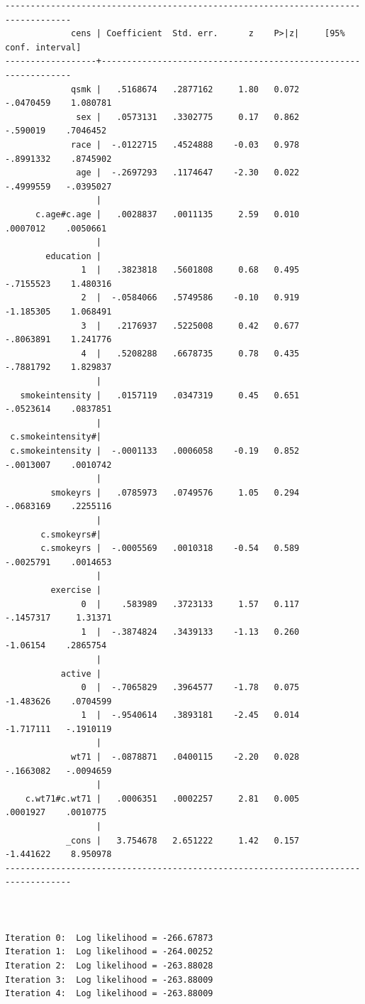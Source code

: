 \documentclass[
  10pt,
  a4paper,
]{book}
\begin{document}
\begin{verbatim}
-----------------------------------------------------------------------------------
             cens | Coefficient  Std. err.      z    P>|z|     [95% conf. interval]
------------------+----------------------------------------------------------------
             qsmk |   .5168674   .2877162     1.80   0.072    -.0470459    1.080781
              sex |   .0573131   .3302775     0.17   0.862     -.590019    .7046452
             race |  -.0122715   .4524888    -0.03   0.978    -.8991332    .8745902
              age |  -.2697293   .1174647    -2.30   0.022    -.4999559   -.0395027
                  |
      c.age#c.age |   .0028837   .0011135     2.59   0.010     .0007012    .0050661
                  |
        education |
               1  |   .3823818   .5601808     0.68   0.495    -.7155523    1.480316
               2  |  -.0584066   .5749586    -0.10   0.919    -1.185305    1.068491
               3  |   .2176937   .5225008     0.42   0.677    -.8063891    1.241776
               4  |   .5208288   .6678735     0.78   0.435    -.7881792    1.829837
                  |
   smokeintensity |   .0157119   .0347319     0.45   0.651    -.0523614    .0837851
                  |
 c.smokeintensity#|
 c.smokeintensity |  -.0001133   .0006058    -0.19   0.852    -.0013007    .0010742
                  |
         smokeyrs |   .0785973   .0749576     1.05   0.294    -.0683169    .2255116
                  |
       c.smokeyrs#|
       c.smokeyrs |  -.0005569   .0010318    -0.54   0.589    -.0025791    .0014653
                  |
         exercise |
               0  |    .583989   .3723133     1.57   0.117    -.1457317     1.31371
               1  |  -.3874824   .3439133    -1.13   0.260     -1.06154    .2865754
                  |
           active |
               0  |  -.7065829   .3964577    -1.78   0.075    -1.483626    .0704599
               1  |  -.9540614   .3893181    -2.45   0.014    -1.717111   -.1910119
                  |
             wt71 |  -.0878871   .0400115    -2.20   0.028    -.1663082   -.0094659
                  |
    c.wt71#c.wt71 |   .0006351   .0002257     2.81   0.005     .0001927    .0010775
                  |
            _cons |   3.754678   2.651222     1.42   0.157    -1.441622    8.950978
-----------------------------------------------------------------------------------



Iteration 0:  Log likelihood = -266.67873  
Iteration 1:  Log likelihood = -264.00252  
Iteration 2:  Log likelihood = -263.88028  
Iteration 3:  Log likelihood = -263.88009  
Iteration 4:  Log likelihood = -263.88009  


\end{verbatim}
\end{document}
